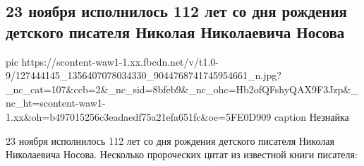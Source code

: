  
 
 
 
 
 
\subsection{23 ноября исполнилось 112 лет со дня рождения детского писателя Николая Николаевича Носова}
\label{sec:24_11_2020.fb.maslov_evgenij.1.nikolaj_nosov}


\ifcmt
pic https://scontent-waw1-1.xx.fbcdn.net/v/t1.0-9/127444145_1356407078034330_9044768741745954661_n.jpg?_nc_cat=107&ccb=2&_nc_sid=8bfeb9&_nc_ohc=Hb2ofQFshyQAX9F3Jzp&_nc_ht=scontent-waw1-1.xx&oh=b497015256c3eadaedf75a21efa651fc&oe=5FE0D909
caption Незнайка
\fi

23 ноября исполнилось 112 лет со дня рождения детского писателя Николая Николаевича Носова.
Несколько пророческих цитат из известной книги писателя:

